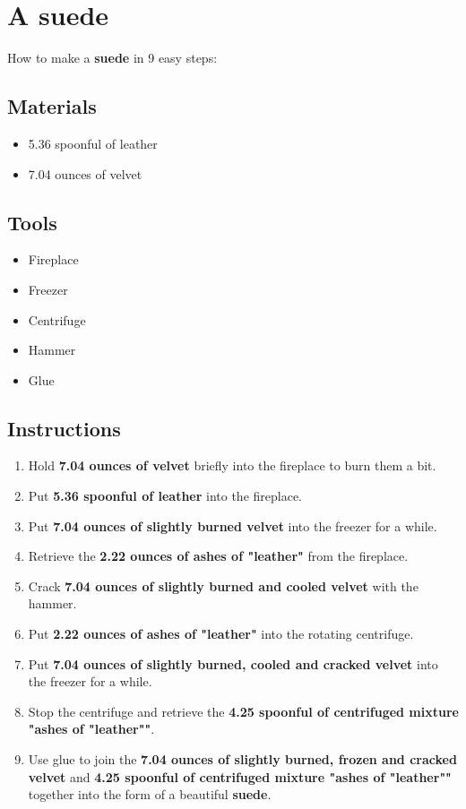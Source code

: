 \documentclass{article}
\begin{document}
\section{A suede}How to make a \textbf{suede} in 9 easy steps:

\subsection{Materials}\begin{itemize}
\item 
5.36 spoonful of leather
\item 
7.04 ounces of velvet
\end{itemize}
\subsection{Tools}\begin{itemize}
\item 
Fireplace
\item 
Freezer
\item 
Centrifuge
\item 
Hammer
\item 
Glue
\end{itemize}
\subsection{Instructions}\begin{enumerate}
\item 
Hold \textbf{7.04 ounces of velvet} briefly into the fireplace to burn them a bit.
\item 
Put \textbf{5.36 spoonful of leather} into the fireplace.
\item 
Put \textbf{7.04 ounces of slightly burned velvet} into the freezer for a while.
\item 
Retrieve the \textbf{2.22 ounces of ashes of "leather"} from the fireplace.
\item 
Crack \textbf{7.04 ounces of slightly burned and cooled velvet} with the hammer.
\item 
Put \textbf{2.22 ounces of ashes of "leather"} into the rotating centrifuge.
\item 
Put \textbf{7.04 ounces of slightly burned, cooled and cracked velvet} into the freezer for a while.
\item 
Stop the centrifuge and retrieve the \textbf{4.25 spoonful of centrifuged mixture "ashes of "leather""}.
\item 
Use glue to join the \textbf{7.04 ounces of slightly burned, frozen and cracked velvet} and \textbf{4.25 spoonful of centrifuged mixture "ashes of "leather""} together into the form of a beautiful \textbf{suede}.
\end{enumerate}
\newpage
\end{document}
